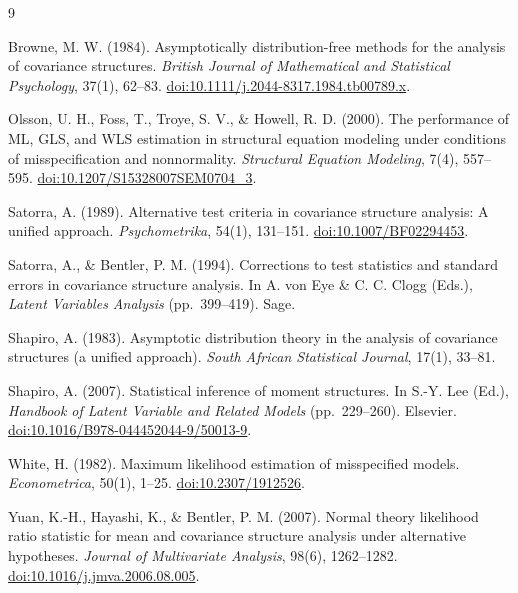 \documentclass[11pt]{article}
\theoremstyle{plain}
\theoremstyle{remark}
\begin{document}
\begin{thebibliography}{9}

Browne, M. W. (1984).
Asymptotically distribution-free methods for the analysis of covariance
structures.
\emph{British Journal of Mathematical and Statistical Psychology}, 37(1),
62--83.
\href{https://doi.org/10.1111/j.2044-8317.1984.tb00789.x}{doi:10.1111/j.2044-8317.1984.tb00789.x}.

Olsson, U. H., Foss, T., Troye, S. V., \& Howell, R. D. (2000).
The performance of ML, GLS, and WLS estimation in structural equation modeling
under conditions of misspecification and nonnormality.
\emph{Structural Equation Modeling}, 7(4), 557--595.
\href{https://doi.org/10.1207/S15328007SEM0704_3}{doi:10.1207/S15328007SEM0704\_3}.

Satorra, A. (1989).
Alternative test criteria in covariance structure analysis: A unified approach.
\emph{Psychometrika}, 54(1), 131--151.
\href{https://doi.org/10.1007/BF02294453}{doi:10.1007/BF02294453}.

Satorra, A., \& Bentler, P. M. (1994).
Corrections to test statistics and standard errors in covariance structure
analysis. In A. von Eye \& C. C. Clogg (Eds.), \emph{Latent Variables Analysis}
(pp.\ 399--419). Sage.

Shapiro, A. (1983).
Asymptotic distribution theory in the analysis of covariance structures (a
unified approach).
\emph{South African Statistical Journal}, 17(1), 33--81.

Shapiro, A. (2007).
Statistical inference of moment structures. In S.-Y. Lee (Ed.),
\emph{Handbook of Latent Variable and Related Models} (pp.\ 229--260). Elsevier.
\href{https://doi.org/10.1016/B978-044452044-9/50013-9}{doi:10.1016/B978-044452044-9/50013-9}.

White, H. (1982).
Maximum likelihood estimation of misspecified models.
\emph{Econometrica}, 50(1), 1--25.
\href{https://doi.org/10.2307/1912526}{doi:10.2307/1912526}.

Yuan, K.-H., Hayashi, K., \& Bentler, P. M. (2007).
Normal theory likelihood ratio statistic for mean and covariance structure
analysis under alternative hypotheses.
\emph{Journal of Multivariate Analysis}, 98(6), 1262--1282.
\href{https://doi.org/10.1016/j.jmva.2006.08.005}{doi:10.1016/j.jmva.2006.08.005}.

\end{thebibliography}
\end{document}
